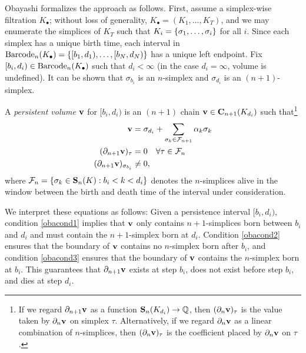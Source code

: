 Obayashi \cite{Obayashi2018} formalizes the approach as follows.  First, assume a simplex-wise filtration $K_\bullet$; without loss of generality, $K_\bullet = (K_1, \ldots, K_T)$, and we may enumerate the simplices of $K_T$ such that $K_i = \{\sigma_1, \ldots, \sigma_i\}$ for all $i$.  Since each simplex has a unique birth time, each interval in  $\mathrm{Barcode}_n(K_\bullet)= \{[b_1, d_1), \ldots, [b_N, d_N)\}$ has a unique left  endpoint.  Fix $[b_i,d_i) \in \mathrm{Barcode}_n(K_\bullet)$ such that $d_i < \infty$ (in the case $d_i = \infty$, volume is undefined).    It can be shown that $\sigma_{b_i}$ is an $n$-simplex and  $\sigma_{d_i}$ is an $(n+1)$-simplex.

A \emph{persistent volume} $\mathbf{v}$ for $[b_i, d_i)$ is an $(n+1)$ chain $\mathbf{v} \in \mathbf{C}_{n+1}(K_{d_i})$ such that\footnote{If we regard $\partial_{n+1}\mathbf{v}$ as a function $\mathbf{S}_{n}(K_{d_i}) \to \mathbb{Q}$, then $(\partial_n \mathbf{v})_\tau$ is the value taken by $\partial_n \mathbf{v}$ on simplex $\tau$.  Alternatively, if we regard $\partial_n \mathbf{v}$ as a linear combination of $n$-simplices, then $(\partial_n \mathbf{v})_\tau$ is the coefficient placed by $\partial_n \mathbf{v}$ on $\tau$.}
\begin{align}
    \mathbf{v}   & = \sigma_{d_i} + \sum_{\sigma_k \in \mathcal{F}_{n+1}} \alpha_k\sigma_k \label{obacond1} \\
    (\partial_{n+1} \mathbf{v})_\tau  & = 0 \quad \forall \tau \in \mathcal{F}_n \label{obacond2}\\
    (\partial_{n+1} \mathbf{v})_{\sigma_{b_i}}  & \ne 0, \label{obacond3}
\end{align}
where $\mathcal{F}_n = \{\sigma_k \in \mathbf{S}_n(K) : b_i < k < d_i \}$ denotes the $n$-simplices alive in the window between the birth and death time of the interval under consideration.   

We interpret these equations as follows: Given a persistence interval $[b_i,d_i)$, condition \eqref{obacond1} implies that $\mathbf{v}$ only contains $n+1$-simplices born between $b_i$ and $d_i$ and must contain the $n+1$-simplex born at $d_i$. Condition \eqref{obacond2} ensures that the boundary of $\mathbf{v}$ contains no $n$-simplex born after $b_i$, and condition \eqref{obacond3} ensures that the boundary of $\mathbf{v}$ contains the $n$-simplex born at $b_i$. This guarantees that $\partial_{n+1}\mathbf{v}$ exists at step $b_i$, does not exist before step $b_i$, and dies at step $d_i$.

